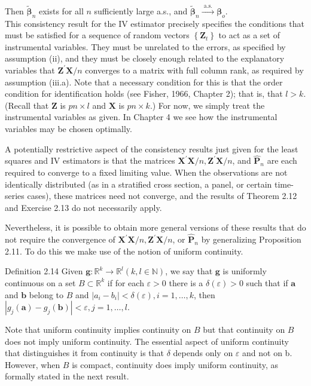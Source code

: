 \documentclass[10pt]{article}
\begin{document}
Then $\tilde{\boldsymbol{\beta}}_{n}$ exists for all $n$ sufficiently large a.s., and $\tilde{\boldsymbol{\beta}}_{n} \xrightarrow{\text { a.s. }} \boldsymbol{\beta}_{o}$.\\
This consistency result for the IV estimator precisely specifies the conditions that must be satisfied for a sequence of random vectors $\left\{\mathbf{Z}_{t}\right\}$ to act as a set of instrumental variables. They must be unrelated to the errors, as specified by assumption (ii), and they must be closely enough related to the explanatory variables that $\mathbf{Z}^{\prime} \mathbf{X} / n$ converges to a matrix with full column rank, as required by assumption (iii.a). Note that a necessary condition for this is that the order condition for identification holds (see Fisher, 1966, Chapter 2); that is, that $l>k$. (Recall that $\mathbf{Z}$ is $p n \times l$ and $\mathbf{X}$ is $p n \times k$.) For now, we simply treat the instrumental variables as given. In Chapter 4 we see how the instrumental variables may be chosen optimally.

A potentially restrictive aspect of the consistency results just given for the least squares and IV estimators is that the matrices $\mathbf{X}^{\prime} \mathbf{X} / n, \mathbf{Z}^{\prime} \mathbf{X} / n$, and $\hat{\mathbf{P}}_{n}$ are each required to converge to a fixed limiting value. When the observations are not identically distributed (as in a stratified cross section, a panel, or certain time-series cases), these matrices need not converge, and the results of Theorem 2.12 and Exercise 2.13 do not necessarily apply.

Nevertheless, it is possible to obtain more general versions of these results that do not require the convergence of $\mathbf{X}^{\prime} \mathbf{X} / n, \mathbf{Z}^{\prime} \mathbf{X} / n$, or $\hat{\mathbf{P}}_{n}$ by generalizing Proposition 2.11. To do this we make use of the notion of uniform continuity.

Definition 2.14 Given $\mathbf{g}: \mathbb{R}^{k} \rightarrow \mathbb{R}^{l}(k, l \in \mathbb{N})$, we say that $\mathbf{g}$ is uniformly continuous on a set $B \subset \mathbb{R}^{k}$ if for each $\varepsilon>0$ there is a $\delta(\varepsilon)>0$ such that if $\mathbf{a}$ and $\mathbf{b}$ belong to $B$ and $\left|a_{i}-b_{i}\right|<\delta(\varepsilon), i=1, \ldots, k$, then $\left|g_{j}(\mathbf{a})-g_{j}(\mathbf{b})\right|< \varepsilon, j=1, \ldots, l$.

Note that uniform continuity implies continuity on $B$ but that continuity on $B$ does not imply uniform continuity. The essential aspect of uniform continuity that distinguishes it from continuity is that $\delta$ depends only on $\varepsilon$ and not on b. However, when $B$ is compact, continuity does imply uniform continuity, as formally stated in the next result.
\end{document}
